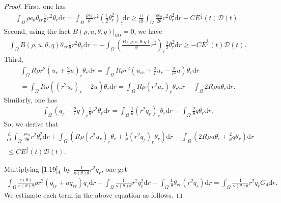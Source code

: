 \documentclass[11pt,reqno]{amsart}
\numberwithin{equation}{section}
\newcommand{\dif}{\mathrm{d}}
\begin{document}
\begin{proof}
 First, one has
 \begin{align*}
 \int_{\Omega} \rho e_\theta \theta_{tr} \frac{1}{\theta} r^2 \theta_r \dif r=\int_{\Omega} \frac{\rho e_\theta}{\theta} r^2 \left(\frac{1}{2} \theta_r^2\right)_t \dif r \ge \frac{\dif}{\dif t} \int_{\Omega} \frac{\rho e_\theta}{2\theta} r^2 \theta_r^2 \dif r
 -C E^\frac{1}{2}(t) \mathcal D(t).
 \end{align*}
 Second, using the fact $B(\rho, u, \theta, q)|_{\partial \Omega}=0$, we have
 \begin{align*}
 \int_{\Omega} B(\rho, u, \theta, q) \theta_{rr} \frac{1}{\theta} r^2\theta_r \dif r=-\int_{\Omega} \left(\frac{B(\rho,u, \theta, q)}{\theta}r^2 \right)_r \frac{1}{2} \theta_r^2 \dif r\ge -C E^\frac{1}{2}(t) \mathcal D(t).
 \end{align*}
 Third,
 \begin{align*}
 \int_{\Omega} R \rho r^2 \left( u_r+\frac{2}{r}u \right)_r \theta_r \dif r =\int_{\Omega} R \rho r^2 (u_{rr}+\frac{2}{r}u_r-\frac{2}{r^2} u)\theta_r \dif r\\
 =\int_{\Omega}  R\rho ( (r^2 u_r)_r-2u)\theta_r\dif r= \int_{\Omega} R\rho (r^2 u_r)_r\theta_r \dif r-\int_{\Omega} 2R \rho u \theta_r \dif r.
 \end{align*}
 Similarly, one has
 \begin{align*}
 \int_{\Omega} \left( q_r+\frac{2}{r} q\right)_r \frac{1}{\theta} r^2 \theta_r \dif r= \int_{\Omega} \frac{1}{\theta} (r^2 q_r)_r \theta_r \dif r- \int_{\Omega} \frac{2}{\theta} q \theta_r\dif r.
 \end{align*}
 So, we derive that
 \begin{align}\label{1.22}
 \frac{\dif}{\dif t} \int_{\Omega} \frac{\rho e_\theta}{2\theta} r^2 \theta_r^2 \dif r +\int_{\Omega}  \left(R \rho(r^2 u_r)_r \theta_r+\frac{1}{\theta} (r^2 q_r)_r \theta_r\right) \dif r
 -\int_{\Omega} (2 R \rho u \theta_r + \frac{2}{\theta} q \theta_r )\dif r \nonumber\\
 \le  CE^\frac{1}{2}(t) \mathcal D(t).
 \end{align}

 Multiplying $\eqref{1.19}_4$ by $\frac{1}{\kappa(\theta)\theta} r^2 q_r$, one get
 \begin{align} \label{1.23}
 \int_{\Omega} \frac{\tau(\theta)}{\kappa(\theta)\theta} \rho r^2 ( q_{tr}+u q_{rr}) q_r\dif r+\int_{\Omega} \frac{1}{\kappa(\theta)\theta} r^2 q_r^2 \dif r+\int_{\Omega} \frac{1}{\theta} \theta_{rr} (r^2 q_r) \dif r=\int_{\Omega} \frac{1}{\kappa(\theta)\theta} r^2 q_r G_4 \dif r.
 \end{align}
 We estimate each term in the above equation as follows.


\end{proof}
\end{document}
